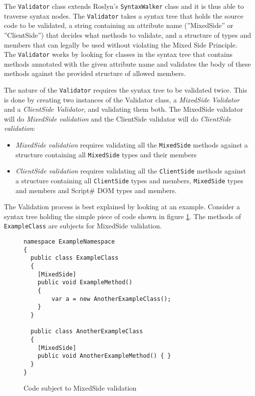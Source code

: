 The \texttt{Validator} class extends Roslyn's \texttt{SyntaxWalker} class and it is thus able to traverse syntax nodes. The \texttt{Validator} takes a syntax tree that holds the source code to be validated, a string containing an attribute name (''MixedSide'' or ''ClientSide'') that decides what methods to validate, and a structure of types and members that can legally be used without violating the Mixed Side Principle. The \texttt{Validator} works by looking for classes in the syntax tree that contains methods annotated with the given attribute name and validates the body of these methods against the provided structure of allowed members.

The nature of the \texttt{Validator} requires the syntax tree to be validated twice. This is done by creating two instances of the Validator class, a \emph{MixedSide Validator} and a \emph{ClientSide Validator}, and validating them both. 
The MixedSide validator will do \emph{MixedSide validation} and the ClientSide validator will do \emph{ClientSide validation}:

\begin{itemize}
	\item \emph{MixedSide validation} requires validating all the \texttt{MixedSide} methods against a structure containing all \texttt{MixedSide} types and their members
	\item \emph{ClientSide validation} requires validating all the \texttt{ClientSide} methods against a structure containing all \texttt{ClientSide} types and members, \texttt{MixedSide} types and members and Script\# DOM types and members.
\end{itemize}


The Validation process is best explained by looking at an example. Consider a syntax tree holding the simple piece of code shown in figure \ref{fig:mixedSideValidationExample}. The methods of \texttt{ExampleClass} are subjects for MixedSide validation.

\begin{figure}[H]
	\begin{lstlisting}[language=CSharp,classoffset=1,morekeywords={ExampleClass,AnotherExampleClass,MixedSide}]
namespace ExampleNamespace
{
  public class ExampleClass
  {
  	[MixedSide]
  	public void ExampleMethod()
  	{
  		var a = new AnotherExampleClass();
  	}
  }
  
  public class AnotherExampleClass
  {
  	[MixedSide]
  	public void AnotherExampleMethod() { }
  }
}
	\end{lstlisting}
	\caption{Code subject to MixedSide validation}
	\label{fig:mixedSideValidationExample}
\end{figure}		

